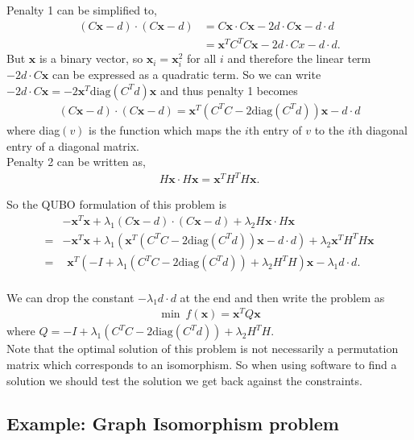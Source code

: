 \documentclass{article}
\begin{document}
\noindent Penalty 1 can be simplified to,
\begin{align*}
    (C\mathbf{x} - d)\cdot (C\mathbf{x} - d) &= C\mathbf{x} \cdot C\mathbf{x} - 2d\cdot C\mathbf{x} - d\cdot d \\
    &= \mathbf{x}^T C^T C \mathbf{x} - 2d\cdot Cx - d\cdot d.
\end{align*}
But \(\mathbf{x}\) is a binary vector, so \(\mathbf{x}_i = \mathbf{x}_i^2\) for all \(i\) and therefore the linear term \(-2d\cdot C\mathbf{x}\) can be expressed as a quadratic term. So we can write \(-2d\cdot C \mathbf{x} = -2\mathbf{x}^T\text{diag}(C^Td)\mathbf{x}\) and thus penalty 1 becomes
\begin{align*}
    (C\mathbf{x} - d)\cdot (C\mathbf{x} - d) = \mathbf{x}^T( C^T C -2\text{diag}(C^T d))\mathbf{x} - d\cdot d
\end{align*}
where diag\((v)\) is the function which maps the \(i\)th entry of \(v\) to the \(i\)th diagonal entry of a diagonal matrix.\\

\noindent Penalty 2 can be written as,
\begin{align*}
    H\mathbf{x} \cdot H\mathbf{x} = \mathbf{x}^T H^T H \mathbf{x}.
\end{align*}

\noindent So the QUBO formulation of this problem is 
\begin{align*}
    &-\mathbf{x}^T \mathbf{x} + \lambda_1(C\mathbf{x} - d)\cdot (C\mathbf{x} - d)  +\lambda_2 H\mathbf{x} \cdot H\mathbf{x}\\
    = &-\mathbf{x}^T \mathbf{x} + \lambda_1(\mathbf{x}^T( C^T C -2\text{diag}(C^T d))\mathbf{x} - d\cdot d) + \lambda_2 \mathbf{x}^T H^T H \mathbf{x}\\
    = &\hspace{5pt} \mathbf{x}^T (-I + \lambda_1( C^T C -2\text{diag}(C^T d)) + 
    \lambda_2 H^T H) \mathbf{x} - \lambda_1 d \cdot d.
\end{align*}\\
We can drop the constant \(- \lambda_1 d \cdot d\) at the end and then write the problem as
\begin{align*}
    \min \: f(\mathbf{x}) = \mathbf{x}^T Q \mathbf{x}
\end{align*}
where \(Q = -I + \lambda_1( C^T C -2\text{diag}(C^T d)) + \lambda_2 H^T H\).\\

\noindent Note that the optimal solution of this problem is not necessarily a permutation matrix which corresponds to an isomorphism. So when using software to find a solution we should test the solution we get back against the constraints.

\subsection{Example: Graph Isomorphism problem}




\nocite{*}
\printbibliography %
\end{document}
